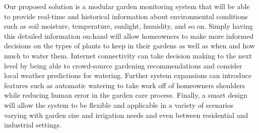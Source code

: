 \documentclass[]{article}
\begin{document}
	
	Our proposed solution is a modular garden monitoring system that will be able to provide real-time and historical information about environmental conditions such as soil moisture, temperature, sunlight, humidity, and so on. Simply having this detailed information on-hand will allow homeowners to make more informed decisions on the types of plants to keep in their gardens as well as when and how much to water them. Internet connectivity can take decision making to the next level by being able to crowd-source gardening recommendations and consider local weather predictions for watering. Further system expansions can introduce features such as automatic watering to take work off of homeowners shoulders while reducing human error in the garden care process. Finally, a smart design will allow the system to be flexible and applicable in a variety of scenarios varying with garden size and irrigation needs and even between residential and industrial settings. 
	
\end{document}
